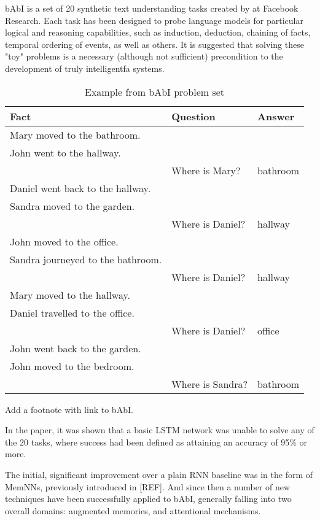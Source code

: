 \documentclass{article}
\begin{document}
bAbI is a set of 20 synthetic text understanding tasks created by \citet{2015arXiv150205698W} at Facebook Research. Each task has been designed to probe language models for particular logical and reasoning capabilities, such as induction, deduction, chaining of facts, temporal ordering of events, as well as others. It is suggested that solving these "toy" problems is a necessary (although not sufficient) precondition to the development of truly intelligentfa systems.

\begin{table}[h]
\caption{Example from bAbI problem set}
\centering
\begin{tabular}{|l|l|l|}
\hline
Fact & Question & Answer \\
\hline
Mary moved to the bathroom. & & \\
John went to the hallway. & & \\
 & Where is Mary? & bathroom \\
Daniel went back to the hallway. & & \\
Sandra moved to the garden. & & \\
 & Where is Daniel? & hallway \\
John moved to the office. & & \\
Sandra journeyed to the bathroom. & & \\
& Where is Daniel? & hallway \\
Mary moved to the hallway. & & \\
Daniel travelled to the office. & & \\
& Where is Daniel? & office \\
John went back to the garden. & & \\
John moved to the bedroom. & & \\
& Where is Sandra? & bathroom \\
\hline
\end{tabular}
\end{table}

Add a footnote with link to bAbI.

In the paper, it was shown that a basic LSTM network was unable to solve any of the 20 tasks, where success had been defined as attaining an accuracy of 95\% or more.

The initial, significant improvement over a plain RNN baseline was in the form of MemNNs, previously introduced in [REF]. And since then a number of new techniques have been successfully applied to bAbI, generally falling into two overall domains: augmented memories, and attentional mechanisms.
\end{document}

